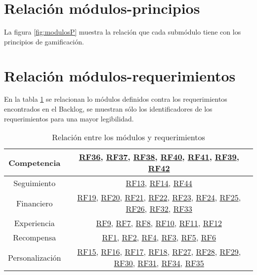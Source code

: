 
\clearpage
\section{Relación módulos-principios}
    La figura \ref{fig:modulosP} muestra la relación que cada submódulo tiene con los principios de gamificación.
    
    
\section{Relación módulos-requerimientos}

En la tabla \ref{tab:modreq} se relacionan lo módulos definidos contra los requerimientos encontrados en el Backlog, se muestran sólo los identificadores de los requerimientos para una mayor legibilidad.

\newcommand{\Refr}[1]{{\hyperlink{#1}{#1}}}
\begin{table}[h!]
    \centering
    \begin{tabular}{|c|c|}
    \hline
        Competencia & \Refr{RF36}, \Refr{RF37}, \Refr{RF38}, \Refr{RF40}, \Refr{RF41}, \Refr{RF39}, \Refr{RF42}\\
    \hline
        Seguimiento & \Refr{RF13}, \Refr{RF14}, \Refr{RF44}\\
    \hline
        Financiero & \Refr{RF19}, \Refr{RF20}, \Refr{RF21}, \Refr{RF22}, \Refr{RF23}, \Refr{RF24}, \Refr{RF25}, \Refr{RF26}, \Refr{RF32}, \Refr{RF33}\\
    \hline
        Experiencia & \Refr{RF9}, \Refr{RF7}, \Refr{RF8}, \Refr{RF10}, \Refr{RF11}, \Refr{RF12}\\
    \hline
        Recompensa & \Refr{RF1}, \Refr{RF2}, \Refr{RF4}, \Refr{RF3}, \Refr{RF5}, \Refr{RF6}\\
    \hline
        Personalización & \Refr{RF15}, \Refr{RF16}, \Refr{RF17}, \Refr{RF18}, \Refr{RF27}, \Refr{RF28}, \Refr{RF29}, \Refr{RF30}, \Refr{RF31}, \Refr{RF34}, \Refr{RF35}\\
    \hline
    \end{tabular}
    \caption{Relación entre los módulos y requerimientos}
    \label{tab:modreq}
\end{table}
